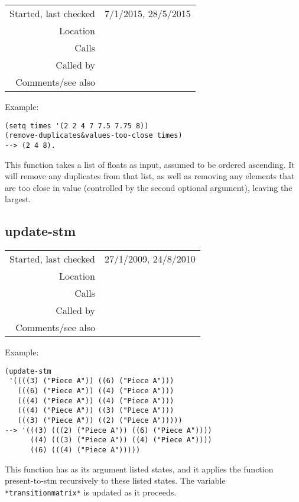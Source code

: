 \vspace{0.3cm}
\begin{tabular}{r|p{8cm}}
Started, last checked & 7/1/2015, 28/5/2015 \\
Location & \nameref{sec:markov-analyse} \\
Calls & \\
Called by & \nameref{fun:kern-file2points-artic-dynam-lyrics} \\
Comments/see also & 
\end{tabular}

\vspace{0.5cm}
\noindent Example:
\begin{verbatim}
(setq times '(2 2 4 7 7.5 7.75 8))
(remove-duplicates&values-too-close times)
--> (2 4 8).
\end{verbatim}

\noindent This function takes a list of floats as
input, assumed to be ordered ascending. It will remove
any duplicates from that list, as well as removing
any elements that are too close in value (controlled by
the second optional argument), leaving the largest.


\subsection*{update-stm}\label{fun:update-stm}

\vspace{0.3cm}
\begin{tabular}{r|p{8cm}}
Started, last checked & 27/1/2009, 24/8/2010 \\
Location & \nameref{sec:markov-analyse} \\
Calls & \nameref{fun:present-to-stm} \\
Called by & \nameref{fun:markov-analyse} \\
Comments/see also & \nameref{fun:update-stm<-}
\end{tabular}

\vspace{0.5cm}
\noindent Example:
\begin{verbatim}
(update-stm
 '((((3) ("Piece A")) ((6) ("Piece A")))
   (((6) ("Piece A")) ((4) ("Piece A")))
   (((4) ("Piece A")) ((4) ("Piece A")))
   (((4) ("Piece A")) ((3) ("Piece A")))
   (((3) ("Piece A")) ((2) ("Piece A")))))
--> '(((3) (((2) ("Piece A")) ((6) ("Piece A"))))
      ((4) (((3) ("Piece A")) ((4) ("Piece A"))))
      ((6) (((4) ("Piece A")))))
\end{verbatim}

\noindent This function has as its argument listed
states, and it applies the function present-to-stm
recursively to these listed states. The variable
\texttt{*transition\-matrix*} is updated as it
proceeds.


























